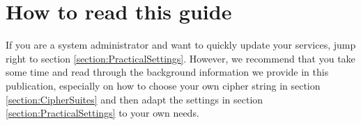 \section{How to read this guide}


If you are a system administrator and want to quickly update your services, jump right to section \ref{section:PracticalSettings}. However, we recommend that you take some time and read through the background information we provide in this publication, especially on how to choose your own cipher string in section \ref{section:CipherSuites} and then adapt the settings in section \ref{section:PracticalSettings} to your own needs.


